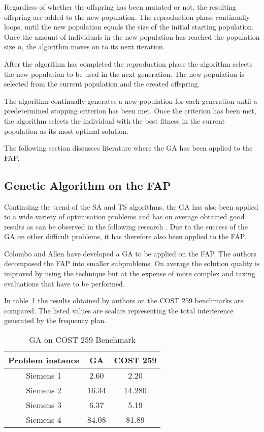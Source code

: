 Regardless of whether the offspring has been mutated or not, the resulting offspring are added to the new population. The reproduction phase continually loops, until the new population equals the size of the initial starting population. Once the amount of individuals in the new population has reached the population size $n$, the algorithm moves on to its next iteration.

After the algorithm has completed the reproduction phase the algorithm selects the new population to be used in the next generation. The new population is selected from the current population and the created offspring.

The algorithm continually generates a new population for each generation until a predetermined stopping criterion has been met. Once the criterion has been met, the algorithm selects the individual with the best fitness in the current population as its most optimal solution.

The following section discusses literature where the \gls{GA} has been applied to the \gls{FAP}.

\subsection{Genetic Algorithm on the \gls{FAP}}
Continuing the trend of the \gls{SA} and \gls{TS} algorithms, the \gls{GA} has also been applied to a wide variety of optimisation problems and has on average obtained good results as can be observed in the following research \cite{GANonConvex,SelfAdaptiveDataMiningGA,AutoComplexMeta}. Due to the success of the \gls{GA} on other difficult problems, it has therefore also been applied to the \gls{FAP}.

Colombo and Allen\cite{ProblemDecompMIFAP} have developed a \gls{GA} to be applied on the \gls{FAP}. The authors decomposed the \gls{FAP} into smaller subproblems. On average the solution quality is improved by using the technique but at the expense of more complex and taxing evaluations that have to be performed\cite{ProblemDecompMIFAP}. 

In table~\ref{tab:GA} the results obtained by authors on the \gls{COST} 259 benchmarks are compared. The listed values are scalars representing the total interference generated by the frequency plan.
\begin{table}[H]
\centering
	\begin{tabular}{| c | c | c |}
	\hline
	Problem instance & \gls{GA} & \gls{COST} 259 \\ \hline
	Siemens 1 & 2.60 & 2.20 \\ \hline
	Siemens 2 & 16.34 & 14.280 \\ \hline
	Siemens 3 & 6.37 & 5.19 \\ \hline
	Siemens 4 & 84.08 & 81.89 \\ \hline
	\end{tabular}
\caption{GA on \gls{COST} 259 Benchmark}
\label{tab:GA}
\end{table}

